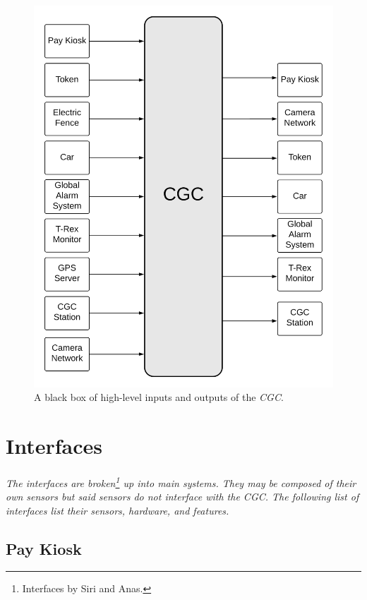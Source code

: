 \documentclass[12pt]{article}
\begin{document}
\begin{figure}[H]
	\centerline{\includegraphics[scale=.17]{CGCBlackBox.png}}
	\caption{A black box of high-level inputs and outputs of the \textit{CGC}.}
	\label{fig:blackbox}
\end{figure}
\vfill
\pagebreak

\section{Interfaces}
\label{int}
\paragraph{} \textit{The interfaces are broken\footnote{Interfaces by Siri 
and Anas.} up into main systems. They may be composed of their own 
sensors but said sensors do not interface with the CGC. The following list of interfaces 
list their sensors, hardware, and features.}

	\subsection{Pay Kiosk}
\end{document}
